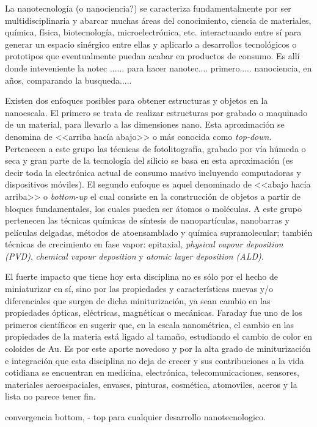 	La nanotecnología (o nanociencia?) se caracteriza fundamentalmente por ser multidisciplinaria y abarcar muchas áreas del conocimiento, ciencia de materiales, química, física, biotecnología, microelectrónica, etc. interactuando entre sí para generar un espacio sinérgico entre ellas y aplicarlo a desarrollos tecnológicos o prototipos que eventualmente puedan acabar en productos de consumo. Es allí donde inteveniente la notec ...... para hacer nanotec.... primero..... nanociencia, en años, comparando la busqueda.....


	Existen dos enfoques posibles para obtener estructuras y objetos en la nanoescala. El primero se trata de realizar estructuras por grabado o maquinado de un material, para llevarlo a las dimensiones nano. Esta aproximación se denomina de <<arriba hacía abajo>> o más conocida como \textit{top-down}. Pertenecen a este grupo las técnicas de fotolitografía, grabado por vía húmeda o seca y gran parte de la tecnología del silicio se basa en esta aproximación (es decir toda la electrónica actual de consumo masivo incluyendo computadoras y dispositivos móviles). El segundo enfoque es aquel denominado de <<abajo hacía arriba>> o \textit{bottom-up} el cual consiste en la construcción de objetos a partir de bloques fundamentales, los cuales pueden ser átomos o moléculas. A este grupo pertenecen las técnicas químicas de síntesis de nanopartículas, nanobarras y películas delgadas, métodos de atoensamblado y química supramolecular; también técnicas de crecimiento en fase vapor: epitaxial, \textit{physical vapour deposition (PVD)}, \textit{chemical vapour deposition} y \textit{atomic layer deposition (ALD)}.

	El fuerte impacto que tiene hoy esta disciplina no es sólo por el hecho de miniaturizar en sí, sino por las propiedades y características nuevas y/o diferenciales que surgen de dicha miniturización, ya sean cambio en las propiedades ópticas, eléctricas, magnéticas o mecánicas. Faraday fue uno de los primeros científicos en sugerir que, en la escala nanométrica, el cambio en las propiedades de la materia está ligado al tamaño, estudiando el cambio de color en coloides de Au\cite{faraday1857}. Es por este aporte novedoso y por la alta grado de miniturización e integración que esta disciplina no deja de crecer y sus contribuciones a la vida cotidiana se encuentran en medicina, electrónica, telecomunicaciones, sensores, materiales aeroespaciales, envases, pinturas, cosmética, atomoviles, aceros y la lista no parece tener fin. 

	convergencia bottom, - top para cualquier desarrollo nanotecnologico.


